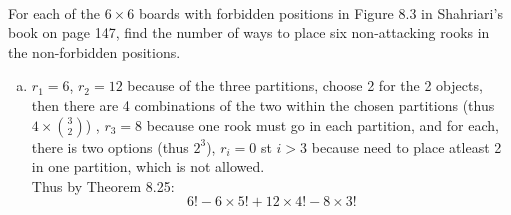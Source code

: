 \documentclass[12pt,letterpaper,boxed]{hmcpset}
\begin{document}
\begin{problem}[Shahriari 8.3.6][20]\\
For each of the $6 \times 6$ boards with forbidden positions in Figure 8.3 in Shahriari's book on page 147, find the number of ways to place six non-attacking rooks in the non-forbidden positions.
\end{problem}

\begin{solution}
\begin{enumerate}[(a)]
\item $r_1 = 6$, $r_2 = 12$ because of the three partitions, choose 2 for the 2 objects, then there are 4 combinations of the two within the chosen partitions (thus $4\times \binom{3}{2}$) , $r_3 = 8$ because one rook must go in each partition, and for each, there is two options (thus $2^3$), $r_i=0$ st $i>3$ because need to place atleast 2 in one partition, which is not allowed.\\
Thus by Theorem 8.25:
$$\boxed{6!-6\times5! +12\times 4! -8\times 3!}$$


\end{enumerate}
\end{solution}
\end{document}
